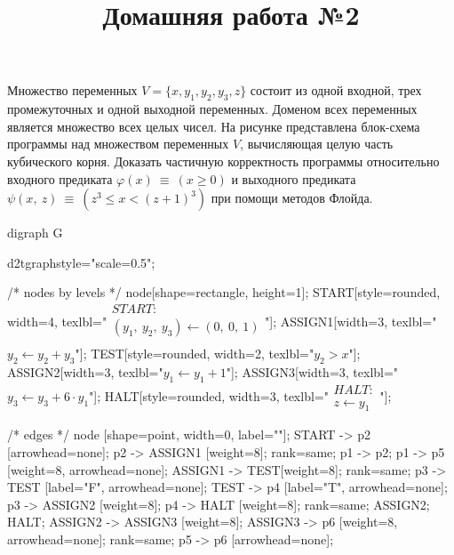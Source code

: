 \documentclass[12pt, a4paper]{article}
\title{Домашняя работа №2}
\date{}
\author{}
\begin{document}
\maketitle

Множество переменных $V = \{ x, y_1, y_2, y_3, z \}$ состоит из одной входной, трех промежуточных и одной выходной переменных. Доменом всех переменных является множество всех целых чисел. На рисунке представлена блок-схема программы над множеством переменных $V$, вычисляющая целую часть кубического корня. Доказать частичную корректность программы относительно входного предиката $\varphi(x)~\equiv~(x \geq 0)$ и выходного предиката $\psi(x,~z)~\equiv~( z^3 \leq x < (z + 1)^3 )$ при помощи методов Флойда.

\hspace{2cm}

\begin{dot2tex}[options=-traw]
	digraph G{
		d2tgraphstyle="scale=0.5";

		/* nodes by levels */
		node[shape=rectangle, height=1];
		START[style=rounded, width=4, texlbl="$\begin{matrix}START:\\ (y_1,~y_2,~y_3) \leftarrow (0,~0,~1)\\\end{matrix}$"];
		ASSIGN1[width=3, texlbl="$y_2 \leftarrow y_2 + y_3$"];
        TEST[style=rounded, width=2, texlbl="$y_2 > x$"];
		ASSIGN2[width=3, texlbl="$y_1 \leftarrow y_1 + 1$"];
		ASSIGN3[width=3, texlbl="$y_3 \leftarrow y_3 + 6 \cdot y_1$"];
		HALT[style=rounded, width=3, texlbl="$\begin{matrix}HALT:\\ z \leftarrow y_1\end{matrix}$"];

        /* edges */
		node [shape=point, width=0, label=""];
		START -> p2 [arrowhead=none]; p2 -> ASSIGN1 [weight=8];
		{ rank=same; p1 -> p2; }
		p1 -> p5 [weight=8, arrowhead=none];
        ASSIGN1 -> TEST[weight=8];
		{ rank=same; p3 -> TEST [label="F", arrowhead=none]; TEST -> p4 [label="T", arrowhead=none]; }
		p3 -> ASSIGN2 [weight=8];
		p4 -> HALT [weight=8];
		{ rank=same; ASSIGN2; HALT; }
        ASSIGN2 -> ASSIGN3 [weight=8];
		ASSIGN3 -> p6 [weight=8, arrowhead=none];
		{ rank=same; p5 -> p6 [arrowhead=none]; }
	}
\end{dot2tex}
\end{document}
